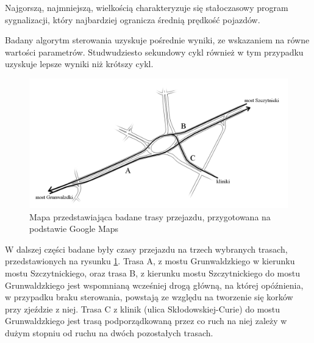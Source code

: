 Najgorszą, najmniejszą, wielkością charakteryzuje się stałoczasowy program sygnalizacji, który najbardziej ogranicza średnią prędkość pojazdów.

Badany algorytm sterowania uzyskuje pośrednie wyniki, ze wskazaniem na równe wartości parametrów. Studwudziesto sekundowy cykl również w tym przypadku uzyskuje lepsze wyniki niż krótszy cykl.

\FloatBarrier
\begin{figure}[h]
    \centering
    \includegraphics[width=1.0\textwidth]{images/mapa_trasy.png}
    \caption{Mapa przedstawiająca badane trasy przejazdu, przygotowana na podstawie Google Maps \cite{google_maps}}
    \label{fig:mapa_trasy}
\end{figure}
\FloatBarrier

W dalszej części badane były czasy przejazdu na trzech wybranych trasach, przedstawionych na rysunku \ref{fig:mapa_trasy}.
Trasa A, z mostu Grunwaldzkiego w kierunku mostu Szczytnickiego, oraz trasa B, z kierunku mostu Szczytnickiego do mostu Grunwaldzkiego jest wspomnianą wcześniej drogą główną, na której opóźnienia, w przypadku braku sterowania, powstają ze względu na tworzenie się korków przy zjeździe z niej. Trasa C z klinik (ulica Skłodowskiej-Curie) do mostu Grunwaldzkiego jest trasą podporządkowaną przez co ruch na niej zależy w dużym stopniu od ruchu na dwóch pozostałych trasach.

